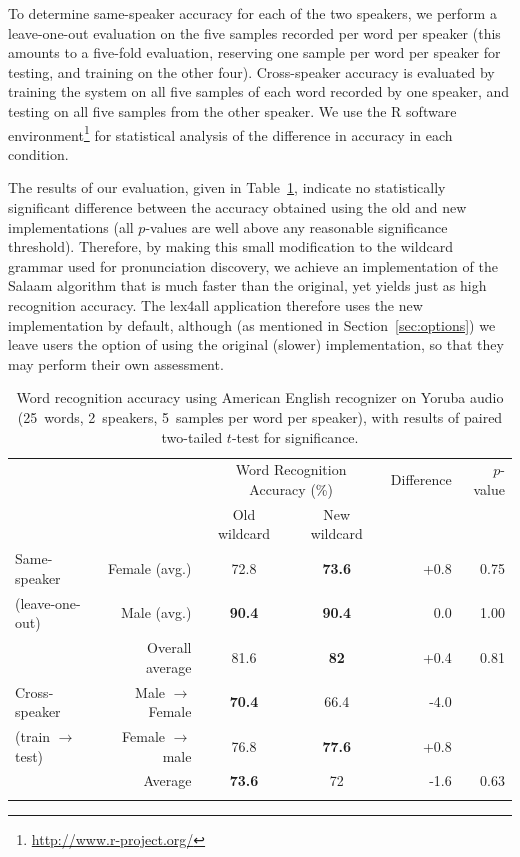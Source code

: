 \documentclass[11pt]{article}
\begin{document}
To determine same-speaker accuracy for each of the two speakers, we perform a leave-one-out evaluation on the five samples recorded per word per speaker (this amounts to a five-fold evaluation, reserving one sample per word per speaker for testing, and training on the other four). Cross-speaker accuracy is evaluated by training the system on all five samples of each word recorded by one speaker, and testing on all five samples from the other speaker.
We use the R software environment\footnote{\url{http://www.r-project.org/}} 
for statistical analysis of the difference in accuracy in each condition.

The results of our evaluation, given in Table~\ref{tab:accuracy}, indicate no statistically significant difference between the accuracy obtained using the old and new implementations (all $p$-values are well above any reasonable significance threshold). Therefore, by making this small modification to the wildcard grammar used for pronunciation discovery, we achieve an implementation of the Salaam algorithm that is much faster than the original, yet yields just as high recognition accuracy. The lex4all application therefore uses the new implementation by default, although (as mentioned in Section~\ref{sec:options}) we leave users the option of using the original (slower) implementation, so that they may perform their own assessment.


\begin{table}[tb]
\begin{center}

\begin{tabular}{lrccrr}
 &  & \multicolumn{2}{c}{Word Recognition Accuracy (\%)} & Difference & $p$-value \\
\cmidrule(rl){3-4}
& & Old wildcard & New wildcard & &  \\
\midrule
\addlinespace
Same-speaker & Female (avg.) & 72.8 & \textbf{73.6} &+0.8 & 0.75 \\
(leave-one-out)		& Male (avg.) & \textbf{90.4} & \textbf{90.4} & 0.0 & 1.00 \\
			& Overall average & 81.6 & \textbf{82} &  +0.4 & 0.81 \\
\addlinespace
\addlinespace

\addlinespace
Cross-speaker	&Male $\rightarrow$ Female & \textbf{70.4} & 66.4 & -4.0 & \\
(train $\rightarrow$ test)		& Female $\rightarrow$ male & 76.8 & \textbf{77.6}& +0.8	&  \\
			&Average & \textbf{73.6} & 72 	&-1.6	& 0.63 \\
\addlinespace
\midrule
\end{tabular}
\end{center}
\caption{Word recognition accuracy using American English recognizer on Yoruba audio (25~words, 2~speakers, 5~samples per word per speaker), with results of paired two-tailed $t$-test for significance.\label{tab:accuracy}}
\end{table}
\end{document}
